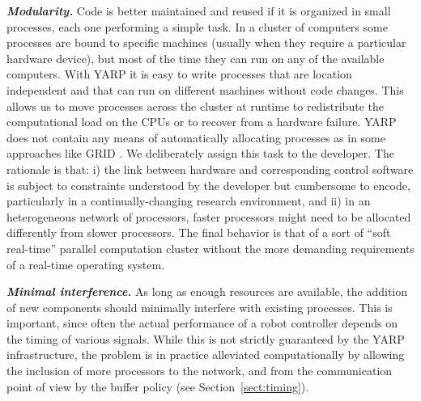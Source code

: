 \textit{\textbf{Modularity.}}
Code is better maintained and reused if it is organized in small processes,
each one performing a simple task. In a cluster of computers some processes 
are bound to specific machines (usually when they require a particular hardware 
device), but most of the time they can run on any of the available computers. 
With YARP it is easy to write processes that are location independent and 
that can run on different machines without code changes. This allows us to move 
processes across the cluster at runtime to redistribute the computational 
load on the CPUs or to recover from a hardware failure. 
YARP does not contain any means of automatically allocating processes as in 
some approaches like GRID \cite{grid}. We deliberately assign this
task to the developer.  The rationale is that: i)
the link between hardware and corresponding control software is subject
to constraints understood by the developer but cumbersome to
encode, particularly in a continually-changing research environment, and
 ii) in an heterogeneous network of processors, faster processors might 
need to be allocated differently from slower processors. The final behavior is that of 
a sort of ``soft real-time'' parallel computation cluster without the more demanding
requirements of a real-time operating system.

\textit{\textbf{Minimal interference.}}
As long as enough resources are available, the addition of new components 
should minimally interfere with existing processes. This is important, since often 
the actual performance of a robot controller depends on the timing of various signals. 
While this is not strictly guaranteed by the YARP infrastructure, the problem is in 
practice alleviated computationally by allowing the inclusion of more processors to 
the network, and from the communication point of view by the buffer policy
(see Section~\ref{sect:timing}).

